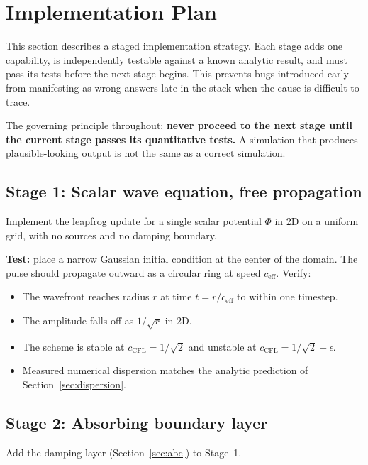 \documentclass[11pt,a4paper]{article}
\begin{document}
\section{Implementation Plan}
\label{sec:impl}

This section describes a staged implementation strategy.  Each stage adds one capability, is independently testable against a known analytic result, and must pass its tests before the next stage begins.  This prevents bugs introduced early from manifesting as wrong answers late in the stack when the cause is difficult to trace.

The governing principle throughout: \textbf{never proceed to the next stage until the current stage passes its quantitative tests.}  A simulation that produces plausible-looking output is not the same as a correct simulation.

\subsection{Stage 1: Scalar wave equation, free propagation}

Implement the leapfrog update for a single scalar potential $\Phi$ in 2D on a uniform grid, with no sources and no damping boundary.

\textbf{Test:} place a narrow Gaussian initial condition at the center of the domain.  The pulse should propagate outward as a circular ring at speed $c_{\mathrm{eff}}$.  Verify:
\begin{itemize}
  \item The wavefront reaches radius $r$ at time $t = r/c_{\mathrm{eff}}$ to within one timestep.
  \item The amplitude falls off as $1/\sqrt{r}$ in 2D.
  \item The scheme is stable at $c_{\mathrm{CFL}} = 1/\sqrt{2}$ and unstable at $c_{\mathrm{CFL}} = 1/\sqrt{2} + \epsilon$.
  \item Measured numerical dispersion matches the analytic prediction of Section~\ref{sec:dispersion}.
\end{itemize}

\subsection{Stage 2: Absorbing boundary layer}

Add the damping layer (Section~\ref{sec:abc}) to Stage~1.
\end{document}
